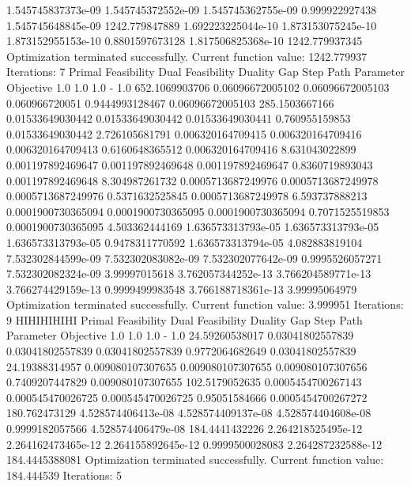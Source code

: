 \documentclass[letterpaper,10pt,english]{sphinxmanual}
\begin{document}
{\begin{sphinxVerbatim}[commandchars=\\\{\}]
1.545745837373e-09  1.545745372552e-09  1.545745362755e-09  0.999922927438   1.545745648845e-09  1242.779847889
1.692223225044e-10  1.873153075245e-10  1.873152955153e-10  0.8801597673128  1.817506825368e-10  1242.779937345
Optimization terminated successfully.
         Current function value: 1242.779937
         Iterations: 7
Primal Feasibility  Dual Feasibility    Duality Gap         Step             Path Parameter      Objective
1.0                 1.0                 1.0                 -                1.0                 652.1069903706
0.06096672005102    0.06096672005103    0.060966720051      0.9444993128467  0.06096672005103    285.1503667166
0.01533649030442    0.01533649030442    0.01533649030441    0.760955159853   0.01533649030442    2.726105681791
0.006320164709415   0.006320164709416   0.006320164709413   0.6160648365512  0.006320164709416   8.631043022899
0.001197892469647   0.001197892469648   0.001197892469647   0.8360719893043  0.001197892469648   8.304987261732
0.0005713687249976  0.0005713687249978  0.0005713687249976  0.5371632525845  0.0005713687249978  6.593737888213
0.0001900730365094  0.0001900730365095  0.0001900730365094  0.7071525519853  0.0001900730365095  4.503362444169
1.636573313793e-05  1.636573313793e-05  1.636573313793e-05  0.9478311770592  1.636573313794e-05  4.082883819104
7.532302844599e-09  7.532302083082e-09  7.532302077642e-09  0.9995526057271  7.532302082324e-09  3.99997015618
3.762057344252e-13  3.766204589771e-13  3.766274429159e-13  0.9999499983548  3.766188718361e-13  3.99995064979
Optimization terminated successfully.
         Current function value: 3.999951
         Iterations: 9
HIHIHIHIHI
Primal Feasibility  Dual Feasibility    Duality Gap         Step             Path Parameter      Objective
1.0                 1.0                 1.0                 -                1.0                 24.59260538017
0.03041802557839    0.03041802557839    0.03041802557839    0.9772064682649  0.03041802557839    24.19388314957
0.009080107307655   0.009080107307655   0.009080107307656   0.7409207447829  0.009080107307655   102.5179052635
0.0005454700267143  0.000545470026725   0.000545470026725   0.95051584666    0.0005454700267272  180.762473129
4.528574406413e-08  4.528574409137e-08  4.528574404608e-08  0.9999182057566  4.528574406479e-08  184.4441432226
2.264218525495e-12  2.264162473465e-12  2.264155892645e-12  0.9999500028083  2.264287232588e-12  184.4445388081
Optimization terminated successfully.
         Current function value: 184.444539
         Iterations: 5
\end{sphinxVerbatim}
}
\end{document}
